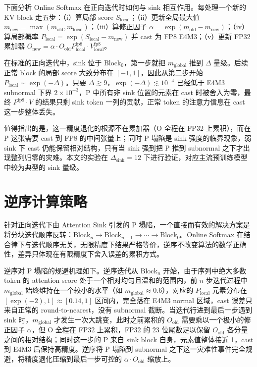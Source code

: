 下面分析 Online Softmax 在正向迭代时如何与 sink 相互作用。每处理一个新的 KV block 走五步：（i）算局部 score $S_{\text{local}}$；（ii）更新全局最大值 $m_{\text{new}} = \max(m_{\text{old}}, m_{\text{local}})$；（iii）算修正因子 $\alpha = \exp(m_{\text{old}} - m_{\text{new}})$；（iv）算局部概率 $P_{\text{local}} = \exp(S_{\text{local}} - m_{\text{new}})$ 并 cast 为 FP8 E4M3；（v）更新 FP32 累加器 $O_{\text{new}} = \alpha \cdot O_{\text{old}}   P_{\text{local}}^{\text{fp8}} \cdot V_{\text{local}}^{\text{fp8}}$。

在标准的正向迭代中，sink 位于 $\text{Block}_0$，第一步就把 $m_{\text{global}}$ 推到 $\Delta$ 量级。后续正常 block 的局部 score 大致分布在 $[-1, 1]$，因此从第二步开始 $P_{\text{local}} \sim \exp(-\Delta)$。只要 $\Delta \gtrsim 9$，$\exp(-\Delta) \lesssim 10^{-4}$ 已经低于 E4M3 subnormal 下界 $2 \times 10^{-3}$，P 中所有非 sink 位置的元素在 cast 时被舍入为零，最终 $P^{\text{fp8}} \cdot V$ 的结果只剩 sink token 一列的贡献，正常 token 的注意力信息在 cast 这一步整体丢失。

值得指出的是，这一精度退化的根源不在累加器（O 全程在 FP32 上累积），而在 P 这张需要 cast 到 FP8 的中间张量上；同时 P 塌陷是 sink 强度的临界现象，弱 sink 下 cast 仍能保留相对结构，只有当 sink 强到把 P 推到 subnormal 之下才出现整列归零的灾难。本文的实验在 $\Delta_{\text{sink}} = 12$ 下进行验证，对应主流预训练模型中较为典型的 sink 量级。

\section{逆序计算策略}

针对正向迭代下由 Attention Sink 引发的 P 塌陷，一个直接而有效的解决方案是将分块迭代顺序反转：$\text{Block}_n \to \text{Block}_{n-1} \to \cdots \to \text{Block}_0$。Online Softmax 在结合律下与迭代顺序无关，无限精度下结果严格等价，逆序不改变算法的数学正确性，差异只体现在有限精度下舍入误差的累积方式。

逆序对 P 塌陷的规避机理如下。逆序迭代从 $\text{Block}_n$ 开始，由于序列中绝大多数 token 的 attention score 处于一个相对均匀且温和的范围内，前 $n$ 步迭代过程中 $m_{\text{global}}$ 始终维持在一个较小的水平（如 $m_{\text{global}} \approx 0.6$），对应的 $P_{\text{local}}$ 元素分布在 $[\exp(-2), 1] \approx [0.14, 1]$ 区间内，完全落在 E4M3 normal 区域，cast 误差只来自正常的 round-to-nearest，没有 subnormal 截断。当迭代行进到最后一步遇到 sink 时，$m_{\text{global}}$ 才发生一次大跳变，此时之前累积的 $O_{\text{old}}$ 需要乘以一个极小的修正因子 $\alpha$，但 O 全程在 FP32 上累积，FP32 的 23 位尾数足以保留 $O_{\text{old}}$ 各分量之间的相对结构；同时这一步的 P 来自 sink block 自身，元素值整体接近 1，cast 到 E4M3 后保持高精度。逆序将 P 塌陷到 subnormal 之下这一灾难性事件完全规避，将精度退化压缩到最后一步可控的 $\alpha \cdot O_{\text{old}}$ 缩放上。

